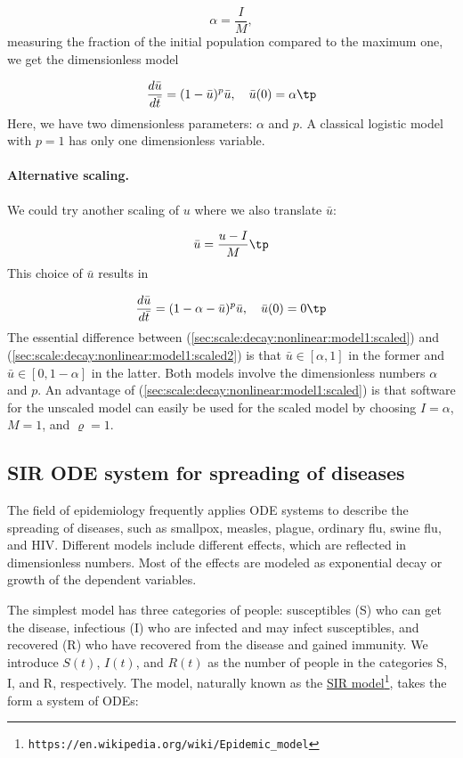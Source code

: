 \documentclass[graybox,envcountchap,sectrefs,final]{svmonodo}
\begin{document}
\[ \alpha = \frac{I}{M},\]
measuring the fraction of the initial population compared to the maximum
one, we get the dimensionless model

\begin{equation}
\frac{d\bar u}{d\bar t} = (1 - \bar u)^p \bar u,\quad
\bar u(0) =\alpha\tp
\label{sec:scale:decay:nonlinear:model1:scaled}
\end{equation}
Here, we have two dimensionless parameters: $\alpha$ and $p$. A classical
logistic model with $p=1$ has only one dimensionless variable.

\paragraph{Alternative scaling.}
We could try another scaling of $u$ where we also translate $\bar u$:

\[ \bar u = \frac{u-I}{M}\tp \]
This choice of $\bar u$ results in

\begin{equation}
\frac{d\bar u}{d\bar t} = (1 - \alpha - \bar u)^p \bar u,\quad
\bar u(0) =0\tp
\label{sec:scale:decay:nonlinear:model1:scaled2}
\end{equation}
The essential difference between (\ref{sec:scale:decay:nonlinear:model1:scaled})
and (\ref{sec:scale:decay:nonlinear:model1:scaled2}) is that
$\bar u\in [\alpha, 1]$ in the former and $\bar u \in [0, 1-\alpha]$ in
the latter. Both models involve the dimensionless numbers $\alpha$ and $p$.
An advantage of (\ref{sec:scale:decay:nonlinear:model1:scaled})
is that software for the unscaled model can easily be used for the
scaled model by choosing $I=\alpha$, $M=1$, and $\varrho=1$.

\subsection{SIR ODE system for spreading of diseases}

The field of epidemiology frequently applies ODE systems to describe
the spreading of diseases, such as smallpox, measles, plague, ordinary
flu, swine flu, and HIV. Different models include different effects,
which are reflected in dimensionless numbers. Most of the effects are
modeled as exponential decay or growth of the dependent variables.

The simplest model has three categories of people: susceptibles (S)
who can get the disease, infectious (I) who are infected and may
infect susceptibles, and recovered (R) who have recovered from the
disease and gained immunity. We introduce $S(t)$, $I(t)$, and $R(t)$
as the number of people in the categories S, I, and R, respectively.
The model, naturally known as the \href{{https://en.wikipedia.org/wiki/Epidemic_model}}{SIR model}\footnote{\texttt{https://en.wikipedia.org/wiki/Epidemic\_model}}, takes the form a
system of ODEs:
\end{document}
